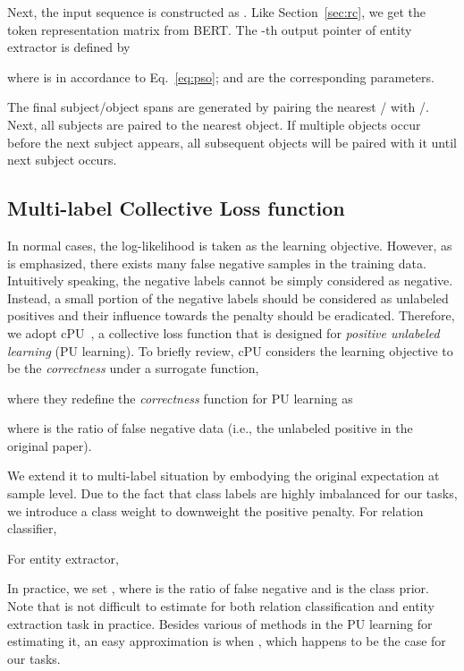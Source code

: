 \documentclass[11pt,a4paper]{article}
\begin{document}
Next, the input sequence is constructed as .
Like Section~\ref{sec:rc}, we get the token representation matrix  from BERT.
The -th output pointer of entity extractor is defined by

where  is in accordance to Eq.~\eqref{eq:pso};  and  are the corresponding parameters.

The final subject/object spans are generated by pairing the nearest / with /. 
Next, all subjects are paired to the nearest object. 
If multiple objects occur before the next subject appears, all subsequent objects will be paired with it until next subject occurs.


\subsection{Multi-label Collective Loss function}

In normal cases, the log-likelihood is taken as the learning objective.
However, as is emphasized, there exists many false negative samples in the training data.
Intuitively speaking, the negative labels cannot be simply considered as negative. 
Instead, a small portion of the negative labels should be considered as unlabeled positives and their influence towards the penalty should be eradicated.
Therefore, we adopt cPU~\cite{Xie2020CollectiveLF}, a collective loss function that is designed for \textit{positive unlabeled learning} (PU learning).
To briefly review, cPU considers the learning objective to be the
\textit{correctness} under a surrogate function,

where they redefine the \textit{correctness} function for PU learning as 

where  is the ratio of false negative data (i.e., the unlabeled positive in the original paper).

We extend it to multi-label situation by embodying the original expectation at sample level. 
Due to the fact that class labels are highly imbalanced for our tasks, we introduce a class weight  to downweight the positive penalty.
For relation classifier,

For entity extractor,


In practice, we set , where  is the ratio of false negative and  is the class prior. 
Note that  is not difficult to estimate for both relation classification and entity extraction task in practice.
Besides various of methods in the PU learning  \cite{Plessis2015ClasspriorEF,Bekker2018EstimatingTC} for estimating it, an easy approximation is  when , which happens to be the case for our tasks.
\end{document}
